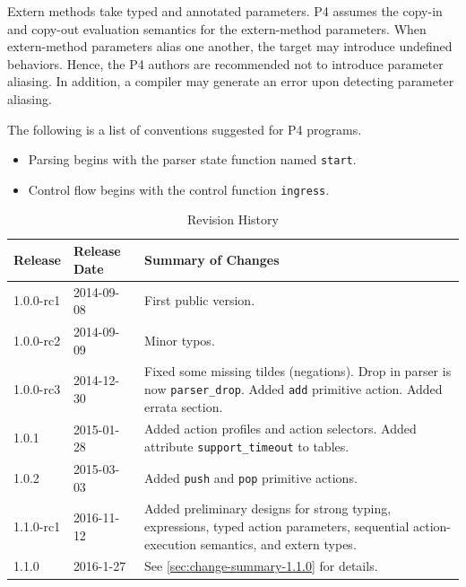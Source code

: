 \documentclass[12pt]{article}
\begin{document}
Extern methods take typed and annotated parameters. P4 assumes the
copy-in and copy-out evaluation semantics for the extern-method parameters.
When extern-method parameters alias one another, the target may introduce
undefined behaviors. Hence, the P4 authors are recommended not to
introduce parameter aliasing. In addition, a compiler may generate
an error upon detecting parameter aliasing.



The following is a list of conventions suggested for P4 programs.

\begin{itemize}
\item
Parsing begins with the parser state function named \texttt{start}.
\item
Control flow begins with the control function \texttt{ingress}.
\end{itemize}


\begin{table}[H]
\begin{center}
\begin{tabular}{| l | l | p{} |} \hline
\textbf{Release} &
\textbf{Release Date} &
\textbf{Summary of Changes} \\  \hline
1.0.0-rc1 & 2014-09-08 & First public version. \\  \hline
1.0.0-rc2 & 2014-09-09 & Minor typos. \\  \hline
1.0.0-rc3 & 2014-12-30 & Fixed some missing tildes (negations). Drop in parser is now \texttt{parser_drop}. Added \texttt{add} primitive action. Added errata section. \\  \hline
1.0.1 & 2015-01-28 & Added action profiles and action selectors. Added attribute \texttt{support_timeout} to tables. \\  \hline
1.0.2 & 2015-03-03 & Added \texttt{push} and \texttt{pop} primitive actions. \\  \hline
1.1.0-rc1 & 2016-11-12 & Added preliminary designs for strong typing, expressions, typed action parameters, sequential action-execution semantics, and extern types. \\  \hline 
1.1.0 & 2016-1-27 & See \ref{sec:change-summary-1.1.0} for details. \\ \hline
\end{tabular}
\end{center}
\caption{Revision History}
\label{tab:revhistory}
\end{table}
\end{document}
